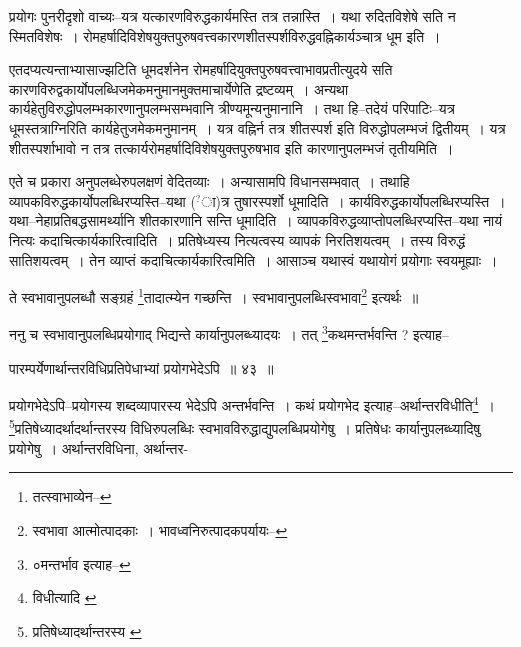 \documentclass[article,12pt,a4paper]{memoir}
\newcommand{\unclear}[1]{($^{?}$#1)}
\begin{document}
	  \endgroup
	

	  \pstart प्रयोगः पुनरीदृशो वाच्यः--यत्र यत्कारणविरुद्धकार्यमस्ति तत्र तन्नास्ति । यथा रुदितविशेषे सति न स्मितविशेषः । रोमहर्षादिविशेषयुक्तपुरुषवत्त्वकारणशीतस्पर्शविरुद्धवह्निकार्यञ्चात्र धूम इति ।
	\pend
      

	  \pstart एतदप्यत्यन्ताभ्यासाज्झटिति धूमदर्शनेन रोमहर्षादियुक्तपुरुषवत्त्वाभावप्रतीत्युदये सति कारणविरुद्वकार्योपलब्धिजमेकमनुमानमुक्तमाचार्येणेति द्रष्टव्यम् । अन्यथा कार्यहेतुविरुद्धोपलम्भकारणानुपलम्भसम्भवानि त्रीण्यमून्यनुमानानि । तथा हि--तदेयं परिपाटिः--यत्र धूमस्तत्राग्निरिति कार्यहेतुजमेकमनुमानम् । यत्र वह्निर्न तत्र शीतस्पर्श इति विरुद्धोपलम्भजं द्वितीयम् । यत्र शीतस्पर्शाभावो न तत्र तत्कार्यरोमहर्षादिविशेषयुक्तपुरुषभाव इति कारणानुपलम्भजं तृतीयमिति ।
	\pend
      

	  \pstart एते च प्रकारा अनुपलब्धेरुपलक्षणं वेदितव्याः । अन्यासामपि विधानसम्भवात् । तथाहि व्यापकविरुद्धकार्योपलब्धिरप्यस्ति--यथा \unclear{ा}त्र तुषारस्पर्शो धूमादिति । कार्यविरुद्धकार्योपलब्धिरप्यस्ति । यथा--नेहाप्रतिबद्धसामर्थ्यानि शीतकारणानि सन्ति धूमादिति । व्यापकविरुद्धव्याप्तोपलब्धिरप्यस्ति--यथा नायं नित्यः कदाचित्कार्यकारित्वादिति । प्रतिषेध्यस्य नित्यत्वस्य व्यापकं निरतिशयत्वम् । तस्य विरुद्धं सातिशयत्वम् । तेन व्याप्तं कदाचित्कार्यकारित्वमिति । आसाञ्च यथास्वं यथायोगं प्रयोगाः स्वयमूह्याः ।
	\pend
	  \bigskip
	  \begingroup
	

	  \pstart ते स्वभावानुपलब्धौ सङ्ग्रहं \footnote{तत्स्वाभाव्येन--\cite{dp-msD-n}}\-तादात्म्येन गच्छन्ति । स्वभावानुपलब्धिस्वभावा\footnote{स्वभावा आत्मोत्पादकाः । भावध्वनिरुत्पादकपर्यायः--\cite{dp-msD-n}} इत्यर्थः ॥
	\pend
       

	  \pstart ननु च स्वभावानुपलब्धिप्रयोगाद् भिद्यन्ते कार्यानुपलब्ध्यादयः । तत् \footnote{०मन्तर्भाव इत्याह--\cite{dp-msC}}\-कथमन्तर्भवन्ति ? इत्याह--
	\pend
       
	  \bigskip
	  \begingroup
	

	  \pstart पारम्पर्येणार्थान्तरविधिप्रतिपेधाभ्यां प्रयोगभेदेऽपि ॥ ४३ ॥
	\pend
      
	  \endgroup
	 

	  \pstart प्रयोगभेदेऽपि--प्रयोगस्य शब्दव्यापारस्य भेदेऽपि अन्तर्भवन्ति । कथं प्रयोगभेद इत्याह--अर्थान्तरविधीति\footnote{विधीत्यादि \cite{dp-edP} \cite{dp-edH} \cite{dp-edE} \cite{dp-edN}} । \footnote{प्रतिषेध्यादर्थान्तरस्य \cite{dp-msB}}\-प्रतिषेध्यादर्थादर्थान्तरस्य विधिरुपलब्धिः स्वभावविरुद्धाद्युपलब्धिप्रयोगेषु । प्रतिषेधः कार्यानुपलब्ध्यादिषु प्रयोगेषु । अर्थान्तरविधिना, अर्थान्तर-
	\pend
      
\end{document}

